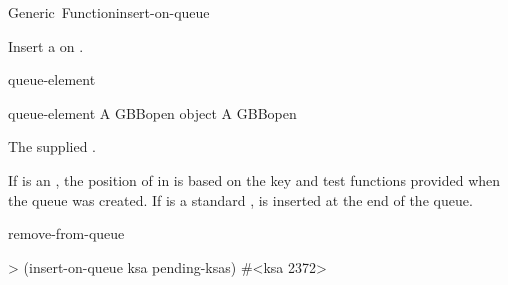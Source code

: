 \documentclass[10pt,twoside,english,pdftex]{article}
\begin{document}
\begin{functiondoc}{Generic~Function}{insert-on-queue}{ \returns{} }
%
%
%

\fnsyntax

\fnpurpose Insert a  on .

\fnmethods
{}%
  {\code{(} queue-element\code{)}
  \code{(}  \returns{} }
%
  {\code{(} 
  \code{(}  \returns{} }

\fnpackage {}

\fnmodule {}

\fnargs
\begin{args}{queue-element}
 A GBBopen  object
\arg[queue] A GBBopen 
\end{args}

\fnreturns The supplied .

\fndescription If  is an
, the position of  in
 is based on the key and test functions provided when the
queue was created.  If  is a standard ,
 is inserted at the end of the queue.
  
\begin{alsos}{remove-from-queue}
\end{alsos}

\fnexample
\begin{example}
> (insert-on-queue ksa pending-ksas)
#<ksa 2372>
\end{example}

\end{functiondoc}

\end{document}
